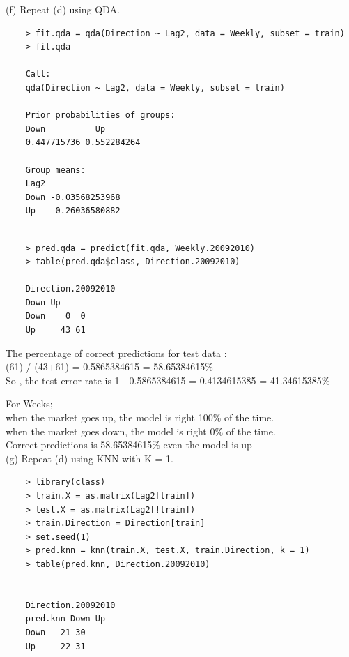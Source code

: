 \documentclass{article}
\begin{document}
\newpage

(f) Repeat (d) using QDA.

\begin{program}
	\begin{verbatim}
	> fit.qda = qda(Direction ~ Lag2, data = Weekly, subset = train)
	> fit.qda
	
	Call:
	qda(Direction ~ Lag2, data = Weekly, subset = train)
	
	Prior probabilities of groups:
	Down          Up 
	0.447715736 0.552284264 
	
	Group means:
	Lag2
	Down -0.03568253968
	Up    0.26036580882
	
	\end{verbatim}
\end{program}

\begin{program}
	\begin{verbatim}
	> pred.qda = predict(fit.qda, Weekly.20092010)
	> table(pred.qda$class, Direction.20092010)
	
	Direction.20092010
	Down Up
	Down    0  0
	Up     43 61
	\end{verbatim}
\end{program}

The percentage of correct predictions for test data : \\
(61) / (43+61) = 0.5865384615 = 58.65384615\% \\
So , the test error rate is 1 - 0.5865384615 = 0.4134615385 = 41.34615385\% 

For Weeks; \\
when the market goes up, the model is right 100\% of the time. \\
when the market goes down, the model is right 0\% of the time.\\
Correct predictions is 58.65384615\%  even the model is up \\

\newpage
(g) Repeat (d) using KNN with K = 1.
\begin{program}
	\begin{verbatim}
	> library(class)
	> train.X = as.matrix(Lag2[train])
	> test.X = as.matrix(Lag2[!train])
	> train.Direction = Direction[train]
	> set.seed(1)
	> pred.knn = knn(train.X, test.X, train.Direction, k = 1)
	> table(pred.knn, Direction.20092010)
	
	
	Direction.20092010
	pred.knn Down Up
	Down   21 30
	Up     22 31
	\end{verbatim}
\end{program}
\end{document}
